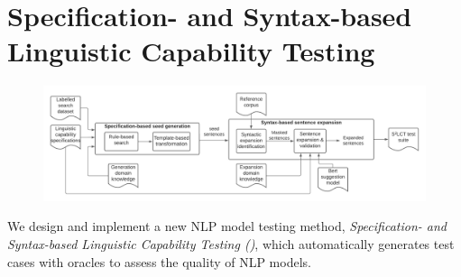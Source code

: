 \section{Specification- and Syntax-based Linguistic Capability Testing}
\label{sec:approach}

\begin{figure}[t]
  \centering
  \includegraphics[width=0.85\linewidth]{figs/overview.pdf}
  \vspace{-2mm}
  \caption{\OverviewFigCaption}
\end{figure}

  
  We design and implement a new NLP model testing method,
\emph{Specification- and Syntax-based Linguistic Capability Testing
  (\tool{})}, which automatically generates test cases with oracles to assess the quality of NLP models.




